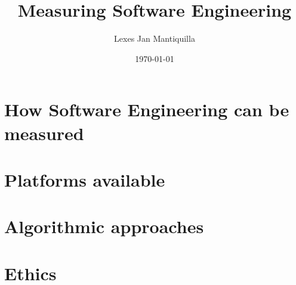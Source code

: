 \documentclass{article}
\title{Measuring Software Engineering}
\author{Lexes Jan Mantiquilla}
\date{\today}
\begin{document}
\maketitle
\tableofcontents
\newpage

\section{How Software Engineering can be measured}
\section{Platforms available}
\section{Algorithmic approaches}
\section{Ethics}
\end{document}
